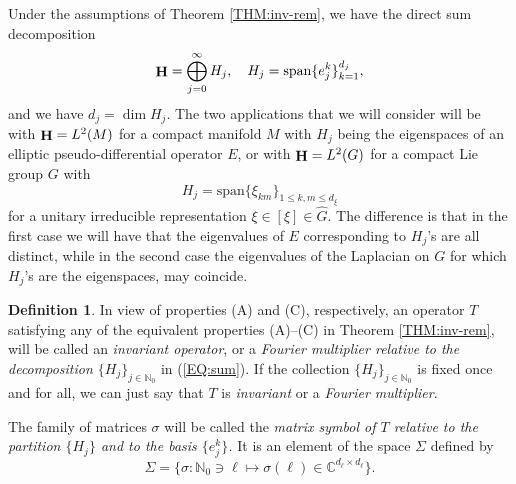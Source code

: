 \documentclass[a4paper,12pt,reqno]{amsart}
\renewcommand\eqref[1]{(\ref{#1})} %
\theoremstyle{definition}
\newtheorem{defn}[thm]{Definition}
\theoremstyle{remark}
\numberwithin{equation}{section}
\newcommand{\ce}{\mathbb{C}}
\def\N{{{\mathbb N}}}
\DeclareMathOperator{\Hcal}{\bf H}
\begin{document}
Under the assumptions of Theorem \ref{THM:inv-rem}, we have the direct sum 
decomposition
\begin{equation}\label{EQ:sum}
\Hcal = \bigoplus_{j=0}^{\infty} H_{j},\quad H_{j}={\rm span} \{e_{j}^{k}\}_{k=1}^{d_{j}},
\end{equation}
and we have $d_{j}=\dim H_{j}.$
The two applications that we will consider will be with $\Hcal=L^{2}(M)$ for a
compact manifold $M$ with $H_{j}$ being the eigenspaces of an elliptic 
pseudo-differential operator $E$, or with $\Hcal=L^{2}(G)$ for a compact Lie group
$G$ with $$H_{j}=\textrm{span}\{\xi_{km}\}_{1\leq k,m\leq d_{\xi}}$$ for a
unitary irreducible representation $\xi\in[\xi]\in\widehat{G}$. The difference
is that in the first case we will have that the eigenvalues of $E$ corresponding
to $H_{j}$'s are all distinct, while in the second case the eigenvalues of the Laplacian
on $G$ for which $H_{j}$'s are the eigenspaces, may coincide.

\begin{defn}\label{inva1}
In view of properties (A) and (C), respectively, an operator $T$ satisfying any of
the equivalent properties (A)--(C) in
Theorem \ref{THM:inv-rem}, will be called an {\em invariant operator}, or
a {\em Fourier multiplier relative to the decomposition
	$\{H_{j}\}_{j\in\N_{0}}$} in \eqref{EQ:sum}.
If the collection $\{H_{j}\}_{j\in\N_{0}}$
is fixed once and for all, we can just say that $T$ is {\em invariant}
or a {\em Fourier multiplier}.

The family of matrices $\sigma$ will be
called the {\em matrix symbol of $T$ relative to the partition $\{H_{j}\}$ and to the
	basis $\{e_{j}^{k}\}$.}
It is an element of the space $\Sigma$ defined by
\begin{equation}\label{EQ:Sigma1}
\Sigma=\{\sigma:\N_{0}\ni\ell\mapsto\sigma(\ell)\in \ce^{d_{\ell}\times d_{\ell}}\}.
\end{equation}
\end{defn}
\end{document}
